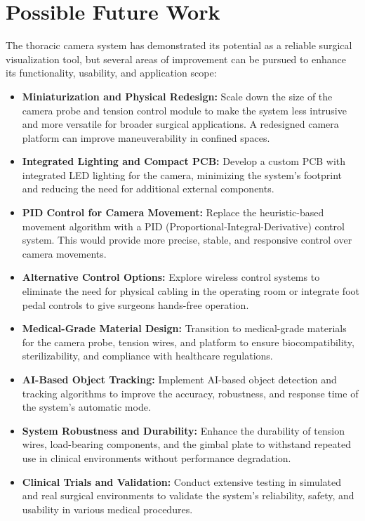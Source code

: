 \section{Possible Future Work}
The thoracic camera system has demonstrated its potential as a reliable surgical visualization tool, but several areas of improvement can be pursued to enhance its functionality, usability, and application scope:

\begin{itemize}
    \item \textbf{Miniaturization and Physical Redesign:} Scale down the size of the camera probe and tension control module to make the system less intrusive and more versatile for broader surgical applications. A redesigned camera platform can improve maneuverability in confined spaces.

    \item \textbf{Integrated Lighting and Compact PCB:} Develop a custom PCB with integrated LED lighting for the camera, minimizing the system's footprint and reducing the need for additional external components.

    \item \textbf{PID Control for Camera Movement:} Replace the heuristic-based movement algorithm with a PID (Proportional-Integral-Derivative) control system. This would provide more precise, stable, and responsive control over camera movements.

    \item \textbf{Alternative Control Options:} Explore wireless control systems to eliminate the need for physical cabling in the operating room or integrate foot pedal controls to give surgeons hands-free operation.

    \item \textbf{Medical-Grade Material Design:} Transition to medical-grade materials for the camera probe, tension wires, and platform to ensure biocompatibility, sterilizability, and compliance with healthcare regulations.

    \item \textbf{AI-Based Object Tracking:} Implement AI-based object detection and tracking algorithms to improve the accuracy, robustness, and response time of the system's automatic mode.

    \item \textbf{System Robustness and Durability:} Enhance the durability of tension wires, load-bearing components, and the gimbal plate to withstand repeated use in clinical environments without performance degradation.

    \item \textbf{Clinical Trials and Validation:} Conduct extensive testing in simulated and real surgical environments to validate the system's reliability, safety, and usability in various medical procedures.
\end{itemize}

